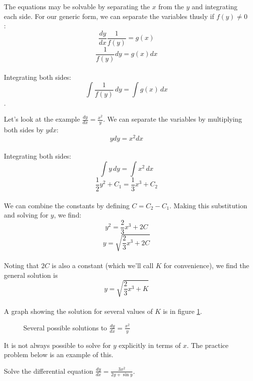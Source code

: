 The equations may be solvable by separating the $x$ from the $y$ and 
integrating each side. For our generic form, we can separate the 
variables thusly if $f(y) \neq 0$: 
$$\frac{dy}{dx}\frac{1}{f(y)} = g(x)$$ 
$$\frac{1}{f(y)}dy = g(x) dx$$ \\
Integrating both sides: $$\int \frac{1}{f(y)}\,dy = \int g(x)\,dx$$.

Let's look at the example $\frac{dy}{dx} = \frac{x^2}{y}$. We can 
separate the variables by multiplying both sides by $y dx$: 
$$y dy = x^2 dx$$\\
Integrating both sides: 
$$\int y\,dy = \int x^2\,dx$$
$$\frac{1}{2}y^2 + C_1 = \frac{1}{3}x^3 + C_2$$ \\
We can combine the constants by defining $C = C_2 - C_1$. Making this 
substitution and solving for $y$, we find: 
$$y^2 = \frac{2}{3} x^3 + 2C$$ 
$$y = \sqrt{\frac{2}{3} x^3 + 2C}$$\\
Noting that $2C$ is also a constant (which we'll call $K$ for 
convenience), we find the general solution is 
$$y = \sqrt{\frac{2}{3} x^3 + K}$$ \\
A graph showing the solution for several values of $K$ is in figure 
\ref{fig:solutions}.

\begin{figure}[htbp]
\centering
    \caption{Several possible solutions to $\frac{dy}{dx} = 
    \frac{x^2}{y}$}
    \label{fig:solutions}
\end{figure}

It is not always possible to solve for $y$ explicitly in terms of 
$x$. The practice problem below is an example of this. 

\begin{Exercise}[label = diffeq1]
	Solve the differential equation $\frac{dy}{dx} = \frac{3x^2}{2y + \sin{y}}$. 
\end{Exercise}


